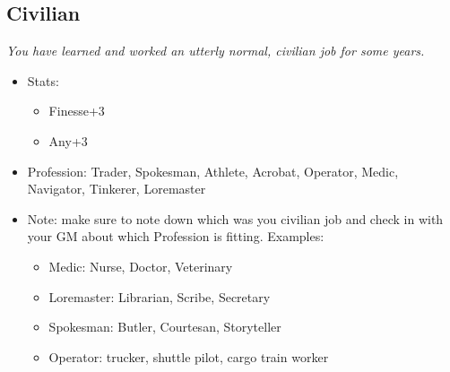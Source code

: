 	\subsection{Civilian}
	\textit{You have learned and worked an utterly normal, civilian job for some years. }
	\begin{itemize}
		\item Stats:
		\begin{itemize}
			\item Finesse+3
			\item Any+3
		\end{itemize}
		\item Profession: Trader, Spokesman, Athlete, Acrobat, Operator, Medic, Navigator, Tinkerer, Loremaster
		\item Note: make sure to note down which was you civilian job and check in with your GM about which Profession is fitting. Examples:
		\begin{itemize}
			\item Medic: Nurse, Doctor, Veterinary
			\item Loremaster: Librarian, Scribe, Secretary
			\item Spokesman: Butler, Courtesan, Storyteller
			\item Operator: trucker, shuttle pilot, cargo train worker
		\end{itemize}
	\end{itemize}
